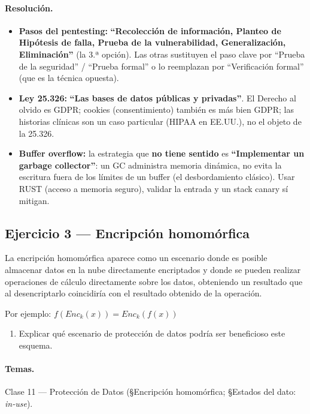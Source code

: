 \paragraph{Resolución.}
\begin{itemize}
  \item \textbf{Pasos del pentesting:} \textbf{``Recolección de información, Planteo de
  Hipótesis de falla, Prueba de la vulnerabilidad, Generalización, Eliminación''} (la 3.ª
  opción). Las otras sustituyen el paso clave por ``Prueba de la seguridad'' / ``Prueba
  formal'' o lo reemplazan por ``Verificación formal'' (que es la técnica opuesta).
  \item \textbf{Ley 25.326:} \textbf{``Las bases de datos públicas y privadas''}. El
  Derecho al olvido es GDPR; cookies (consentimiento) también es más bien GDPR; las
  historias clínicas son un caso particular (HIPAA en EE.UU.), no el objeto de la 25.326.
  \item \textbf{Buffer overflow:} la estrategia que \textbf{no tiene sentido} es
  \textbf{``Implementar un garbage collector''}: un GC administra memoria dinámica, no
  evita la escritura fuera de los límites de un buffer (el desbordamiento clásico). Usar
  RUST (acceso a memoria seguro), validar la entrada y un stack canary sí mitigan.
\end{itemize}

\subsection{Ejercicio 3 --- Encripción homomórfica}

\begin{consigna}
La encripción homomórfica aparece como un escenario donde es posible almacenar datos en la
nube directamente encriptados y donde se pueden realizar operaciones de cálculo directamente
sobre los datos, obteniendo un resultado que al desencriptarlo coincidiría con el resultado
obtenido de la operación.

Por ejemplo: $f(Enc_k(x)) = Enc_k(f(x))$
\begin{enumerate}
  \item[a)] Explicar qué escenario de protección de datos podría ser beneficioso este esquema.
\end{enumerate}
\end{consigna}

\paragraph{Temas.}
Clase 11 --- Protección de Datos (\S Encripción homomórfica; \S Estados del dato:
\emph{in-use}).

